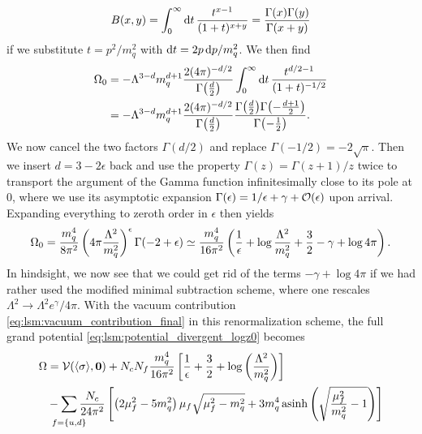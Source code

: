 \begin{equation}
	B(x,y) = \int_0^\infty \mathop{}\!\mathrm{d} t \, \frac{t^{x-1}}{(1+t)^{x+y}} = \frac{\Gamma(x) \Gamma(y)}{\Gamma(x+y)}
\end{equation}
if we substitute $t = p^2/m_q^2$ with $\mathop{}\!\mathrm{d} t = 2 p \mathop{}\!\mathrm{d} p / m_q^2$.
We then find
\begin{equation}
\begin{split}
	\Omega_0 &= -\Lambda^{3-d} m_q^{d+1} \frac{2 (4 \pi)^{-d/2}}{\Gamma\big(\frac{d}{2}\big)} \int_0^\infty \mathop{}\!\mathrm{d} t \, \frac{t^{d/2-1}}{(1+t)^{-1/2}} \\
	         &= -\Lambda^{3-d} m_q^{d+1} \frac{2 (4 \pi)^{-d/2}}{\Gamma\big(\frac{d}{2}\big)} \frac{\Gamma\big(\frac{d}{2}\big) \Gamma\big( \textstyle{-\frac{d+1}{2}} \big)}{\Gamma\big( \textstyle{-\frac{1}{2}} \big)} .
\end{split}
\end{equation}
We now cancel the two factors $\Gamma(d/2)$ and replace $\Gamma(-1/2) = -2\sqrt{\pi}$.
Then we insert $d = 3 - 2 \epsilon$ back and use the property $\Gamma(z) = \Gamma(z+1) / z$ twice to transport the argument of the Gamma function infinitesimally close to its pole at $0$,
where we use its asymptotic expansion $\Gamma(\epsilon) = 1/\epsilon + \gamma + \mathcal{O}(\epsilon)$ upon arrival.
Expanding everything to zeroth order in $\epsilon$ then yields
\begin{equation}
	\Omega_0 =       \frac{m_q^4}{8 \pi^2} \left( 4 \pi \frac{\Lambda^2}{m_q^2} \right)^\epsilon \Gamma(-2 + \epsilon)
	         \simeq \frac{m_q^4}{16 \pi^2} \left( \frac{1}{\epsilon} + \log \frac{\Lambda^2}{m_q^2} + \frac32 - \gamma + \log 4 \pi \right) .
\label{eq:lsm:vacuum_contribution_final}
\end{equation}
In hindsight, we now see that we could get rid of the terms $-\gamma + \log 4 \pi$ if we had rather used the modified minimal subtraction scheme, where one rescales $\Lambda^2 \rightarrow \Lambda^2 e^\gamma / 4 \pi$.
With the vacuum contribution \eqref{eq:lsm:vacuum_contribution_final} in this renormalization scheme, the full grand potential \eqref{eq:lsm:potential_divergent_logz0} becomes
\begin{equation}
\begin{split}
	\Omega &= \pot(\avg{\sigma},\vec{0}) + N_c N_f \frac{m_q^4}{16 \pi^2} \left[ \frac{1}{\epsilon} + \frac{3}{2} + \log\left(\frac{{\Lambda}^2}{m_q^2}\right) \right] \\
	       &- \smashoperator{\sum_{\vphantom{\big|} f=\{u,d\}}} \frac{N_c}{24 \pi^2} \left[ \left( 2 \mu_f^2 - 5 m_q^2 \right) \mu_f \sqrt{\mu_f^2 - m_q^2} + 3 m_q^4 \asinh \left( \sqrt{\frac{\mu_{\smash{f}}^2}{m_q^2}-1} \right) \right]
\end{split}
\end{equation}
